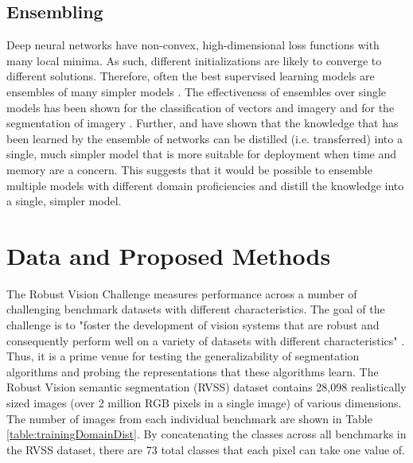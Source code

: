 \documentclass[10pt,twocolumn,letterpaper]{article}
\begin{document}
\subsection{Ensembling}
Deep neural networks have non-convex, high-dimensional loss functions with many local minima. As such, different initializations are likely to converge to
different solutions. Therefore, often the best supervised learning models are ensembles of many simpler models \cite{marmanis2016semantic, buciluǎ2006model}.
The effectiveness of ensembles over single models has been shown for the classification of vectors \cite{buciluǎ2006model} and imagery \cite{szegedy2015going} and for the segmentation of imagery \cite{marmanis2016semantic}.
Further, \citet{buciluǎ2006model} and \citet{hinton2015distilling} have shown that the knowledge that has been learned by the ensemble of networks can be
distilled (i.e. transferred) into a single, much simpler model that is more suitable for deployment when time and memory are a concern. This suggests
that it would be possible to ensemble multiple models with different domain proficiencies and distill the knowledge into a single, simpler model.

\iffalse
\begin{figure}[t]
\begin{center}
\fbox{\rule{0pt}{2in} \rule{0.9\linewidth}{0pt}}
\end{center}
   \caption{Example of caption.  It is set in Roman so that mathematics
   (always set in Roman: $B \sin A = A \sin B$) may be included without an
   ugly clash.}
\label{fig:long}
\label{fig:onecol}
\end{figure}
\fi

\section{Data and Proposed Methods} \label{Data and Proposed Methods}
The Robust Vision Challenge measures performance across a number of challenging benchmark datasets with different characteristics.
The goal of the challenge is to "foster the development of vision systems that are robust and consequently perform well on a variety of datasets with different characteristics" \cite{robustvisionchallenge2018}.
Thus, it is a prime venue for testing the generalizability of segmentation algorithms and probing the representations that these algorithms learn.
The Robust Vision semantic segmentation (RVSS) dataset contains 28,098 realistically sized images (over 2 million RGB pixels in a single image) of various dimensions. The number of images
from each individual benchmark are shown in Table \ref{table:trainingDomainDist}. By concatenating the classes across all benchmarks in the RVSS dataset, there are 73 total classes that each pixel can take one value of.
\end{document}

